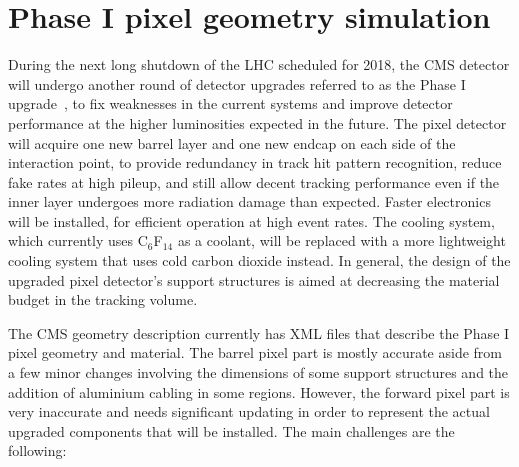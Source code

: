 \section{Phase I pixel geometry simulation\label{sec:matbudg-phase1}}

During the next long shutdown of the LHC scheduled for 2018, the CMS detector will undergo another round of detector upgrades referred to as the Phase I upgrade~\cite{Dominguez:1481838}, to fix weaknesses in the current systems and improve detector performance at the higher luminosities expected in the future. The pixel detector will acquire one new barrel layer and one new endcap on each side of the interaction point, to provide redundancy in track hit pattern recognition, reduce fake rates at high pileup, and still allow decent tracking performance even if the inner layer undergoes more radiation damage than expected. Faster electronics will be installed, for efficient operation at high event rates. The cooling system, which currently uses C$_{6}$F$_{14}$ as a coolant, will be replaced with a more lightweight cooling system that uses cold carbon dioxide instead. In general, the design of the upgraded pixel detector's support structures is aimed at decreasing the material budget in the tracking volume.

The CMS geometry description currently has XML files that describe the Phase I pixel geometry and material. The barrel pixel part is mostly accurate aside from a few minor changes involving the dimensions of some support structures and the addition of aluminium cabling in some regions. However, the forward pixel part is very inaccurate and needs significant updating in order to represent the actual upgraded components that will be installed. The main challenges are the following:

